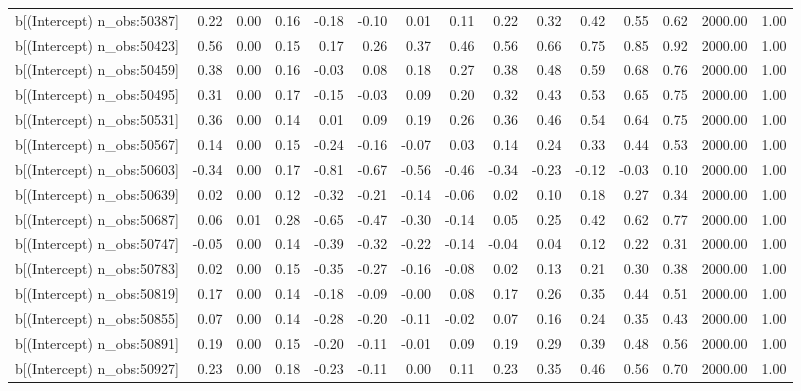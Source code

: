 \begin{table}[ht]
\begin{tabular}{rrrrrrrrrrrrrrr}
  b[(Intercept) n\_obs:50387] & 0.22 & 0.00 & 0.16 & -0.18 & -0.10 & 0.01 & 0.11 & 0.22 & 0.32 & 0.42 & 0.55 & 0.62 & 2000.00 & 1.00 \\ 
  b[(Intercept) n\_obs:50423] & 0.56 & 0.00 & 0.15 & 0.17 & 0.26 & 0.37 & 0.46 & 0.56 & 0.66 & 0.75 & 0.85 & 0.92 & 2000.00 & 1.00 \\ 
  b[(Intercept) n\_obs:50459] & 0.38 & 0.00 & 0.16 & -0.03 & 0.08 & 0.18 & 0.27 & 0.38 & 0.48 & 0.59 & 0.68 & 0.76 & 2000.00 & 1.00 \\ 
  b[(Intercept) n\_obs:50495] & 0.31 & 0.00 & 0.17 & -0.15 & -0.03 & 0.09 & 0.20 & 0.32 & 0.43 & 0.53 & 0.65 & 0.75 & 2000.00 & 1.00 \\ 
  b[(Intercept) n\_obs:50531] & 0.36 & 0.00 & 0.14 & 0.01 & 0.09 & 0.19 & 0.26 & 0.36 & 0.46 & 0.54 & 0.64 & 0.75 & 2000.00 & 1.00 \\ 
  b[(Intercept) n\_obs:50567] & 0.14 & 0.00 & 0.15 & -0.24 & -0.16 & -0.07 & 0.03 & 0.14 & 0.24 & 0.33 & 0.44 & 0.53 & 2000.00 & 1.00 \\ 
  b[(Intercept) n\_obs:50603] & -0.34 & 0.00 & 0.17 & -0.81 & -0.67 & -0.56 & -0.46 & -0.34 & -0.23 & -0.12 & -0.03 & 0.10 & 2000.00 & 1.00 \\ 
  b[(Intercept) n\_obs:50639] & 0.02 & 0.00 & 0.12 & -0.32 & -0.21 & -0.14 & -0.06 & 0.02 & 0.10 & 0.18 & 0.27 & 0.34 & 2000.00 & 1.00 \\ 
  b[(Intercept) n\_obs:50687] & 0.06 & 0.01 & 0.28 & -0.65 & -0.47 & -0.30 & -0.14 & 0.05 & 0.25 & 0.42 & 0.62 & 0.77 & 2000.00 & 1.00 \\ 
  b[(Intercept) n\_obs:50747] & -0.05 & 0.00 & 0.14 & -0.39 & -0.32 & -0.22 & -0.14 & -0.04 & 0.04 & 0.12 & 0.22 & 0.31 & 2000.00 & 1.00 \\ 
  b[(Intercept) n\_obs:50783] & 0.02 & 0.00 & 0.15 & -0.35 & -0.27 & -0.16 & -0.08 & 0.02 & 0.13 & 0.21 & 0.30 & 0.38 & 2000.00 & 1.00 \\ 
  b[(Intercept) n\_obs:50819] & 0.17 & 0.00 & 0.14 & -0.18 & -0.09 & -0.00 & 0.08 & 0.17 & 0.26 & 0.35 & 0.44 & 0.51 & 2000.00 & 1.00 \\ 
  b[(Intercept) n\_obs:50855] & 0.07 & 0.00 & 0.14 & -0.28 & -0.20 & -0.11 & -0.02 & 0.07 & 0.16 & 0.24 & 0.35 & 0.43 & 2000.00 & 1.00 \\ 
  b[(Intercept) n\_obs:50891] & 0.19 & 0.00 & 0.15 & -0.20 & -0.11 & -0.01 & 0.09 & 0.19 & 0.29 & 0.39 & 0.48 & 0.56 & 2000.00 & 1.00 \\ 
  b[(Intercept) n\_obs:50927] & 0.23 & 0.00 & 0.18 & -0.23 & -0.11 & 0.00 & 0.11 & 0.23 & 0.35 & 0.46 & 0.56 & 0.70 & 2000.00 & 1.00 \\ 

\end{tabular}
\end{table}
